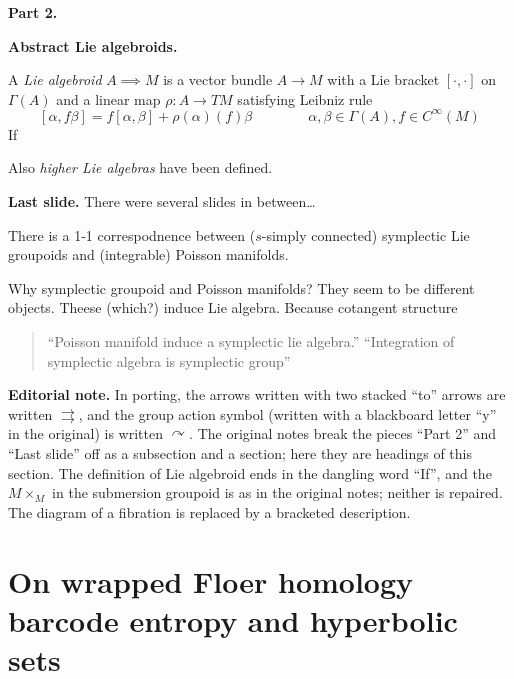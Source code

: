 \medskip\noindent
{\bf Part 2.}

\medskip\noindent
{\bf Abstract Lie algebroids.}

\begin{definition}
\label{definition-hoyo-lie-algebroid}
A \emph{Lie algebroid} $A \implies M$ is a
vector bundle $A \to M$ with a Lie bracket
$[\cdot,\cdot]$ on $\Gamma(A)$ and a linear
map $\rho:A \to TM$ satisfying Leibniz rule
$$
[\alpha,f
\beta]=f[\alpha,\beta]+\rho(\alpha)(f)\beta
\qquad \qquad \alpha, \beta \in \Gamma(A),f
\in C^\infty(M)
$$
If
\end{definition}

\begin{remark}
\label{remark-hoyo-higher-algebras}
Also \emph{higher Lie algebras} have been
defined.
\end{remark}

\medskip\noindent
{\bf Last slide.}
There were several slides in between\ldots{}

\begin{theorem}
\label{theorem-hoyo-crainic-fernandes}
There is a 1-1 correspodnence between
($s$-simply connected) symplectic Lie
groupoids and (integrable) Poisson manifolds.
\end{theorem}

Why symplectic groupoid and Poisson
manifolds? They seem to be different objects.
Theese (which?) induce Lie algebra. Because
cotangent structure

\begin{quotation}
``Poisson manifold induce a symplectic lie
algebra.'' ``Integration of symplectic
algebra is symplectic group''
\end{quotation}

\medskip\noindent
{\bf Editorial note.} In porting, the
arrows written with two stacked ``to''
arrows are written $\rightrightarrows$,
and the group action symbol (written with a
blackboard letter ``y'' in the original) is
written $\curvearrowright$. The original
notes break the pieces ``Part 2'' and
``Last slide'' off as a subsection and a
section; here they are headings of this
section. The definition of Lie algebroid
ends in the dangling word ``If'', and the
$M \times_M$ in the submersion groupoid
is as in the original notes; neither is
repaired. The diagram of a fibration is
replaced by a bracketed description.

\section{On wrapped Floer homology barcode
entropy and hyperbolic sets}
\label{section-wrapp-floer-homol-barco}

